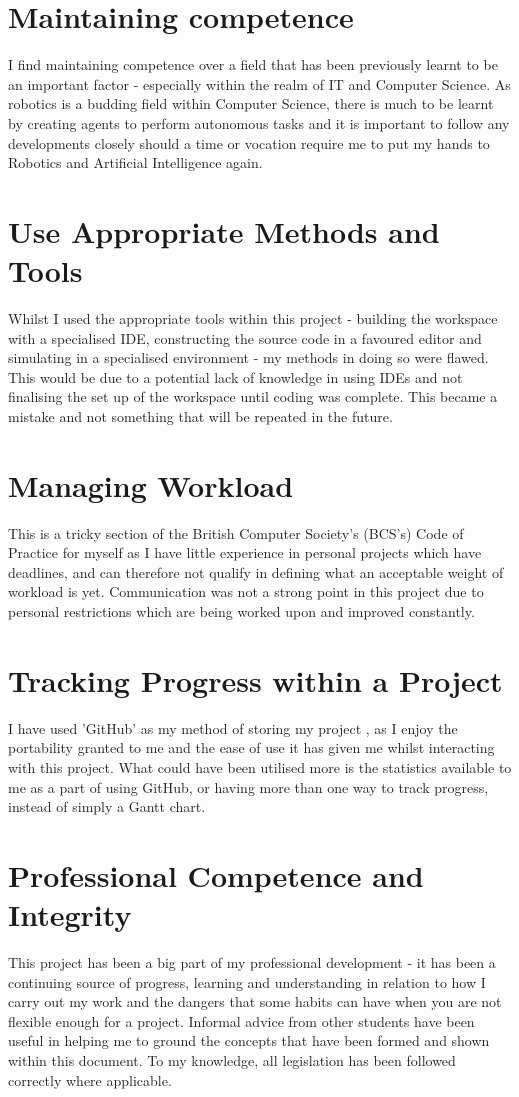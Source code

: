 \section{Maintaining competence}
I find maintaining competence over a field that has been previously learnt to
be an important factor - especially within the realm of IT and Computer
Science.  As robotics is a budding field within Computer Science, there is
much to be learnt by creating agents to perform autonomous tasks and it is
important to follow any developments closely should a time or vocation require
me to put my hands to Robotics and Artificial Intelligence again.

\section{Use Appropriate Methods and Tools}
Whilst I used the appropriate tools within this project - building the
workspace with a specialised IDE, constructing the source code in a favoured
editor and simulating in a specialised environment - my methods in doing so
were flawed.  This would be due to a potential lack of knowledge in using IDEs
and not finalising the set up of the workspace until coding was complete.  This
became a mistake and not something that will be repeated in the future.

\section{Managing Workload}
This is a tricky section of the British Computer Society's (BCS's) Code of
Practice \cite{codeOfPractice} for myself as I have little experience in
personal projects which have deadlines, and can therefore not qualify in
defining what an acceptable weight of workload is yet.  Communication was not a
strong point in this project due to personal restrictions which are being
worked upon and improved constantly.

\section{Tracking Progress within a Project}
I have used 'GitHub' as my method of storing my project \cite{GithubRepo}, as I
enjoy the portability granted to me and the ease of use it has given me whilst
interacting with this project.  What could have been utilised more is the
statistics available to me as a part of using GitHub, or having more than one
way to track progress, instead of simply a Gantt chart.

\section{Professional Competence and Integrity}
This project has been a big part of my professional development - it has been a
continuing source of progress, learning and understanding in relation to how I
carry out my work and the dangers that some habits can have when you are not
flexible enough for a project.  Informal advice from other students have been
useful in helping me to ground the concepts that have been formed and shown
within this document.  To my knowledge, all legislation has been followed
correctly where applicable.
